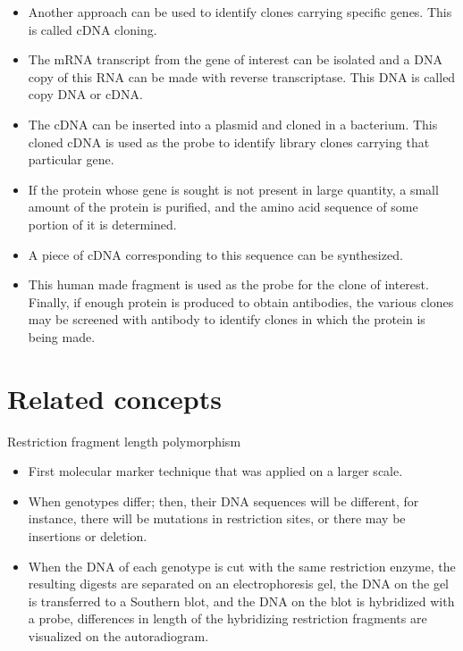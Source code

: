 \documentclass[11pt,dvipsnames,ignorenonframetext,aspectratio=169]{beamer}
\providecommand{\tightlist}{%
  \setlength{\itemsep}{0pt}\setlength{\parskip}{0pt}}
\begin{document}
\begin{frame}{}
\protect\hypertarget{section-21}{}
\begin{itemize}
\tightlist
\item
  Another approach can be used to identify clones carrying specific
  genes. This is called cDNA cloning.
\item
  The mRNA transcript from the gene of interest can be isolated and a
  DNA copy of this RNA can be made with reverse transcriptase. This DNA
  is called copy DNA or cDNA.
\item
  The cDNA can be inserted into a plasmid and cloned in a bacterium.
  This cloned cDNA is used as the probe to identify library clones
  carrying that particular gene.
\item
  If the protein whose gene is sought is not present in large quantity,
  a small amount of the protein is purified, and the amino acid sequence
  of some portion of it is determined.
\item
  A piece of cDNA corresponding to this sequence can be synthesized.
\item
  This human made fragment is used as the probe for the clone of
  interest. Finally, if enough protein is produced to obtain antibodies,
  the various clones may be screened with antibody to identify clones in
  which the protein is being made.
\end{itemize}
\end{frame}

\hypertarget{related-concepts}{%
\section{Related concepts}\label{related-concepts}}

\begin{frame}{Restriction fragment length polymorphism}
\protect\hypertarget{restriction-fragment-length-polymorphism}{}
\begin{itemize}
\tightlist
\item
  First molecular marker technique that was applied on a larger scale.
\item
  When genotypes differ; then, their DNA sequences will be different,
  for instance, there will be mutations in restriction sites, or there
  may be insertions or deletion.
\item
  When the DNA of each genotype is cut with the same restriction enzyme,
  the resulting digests are separated on an electrophoresis gel, the DNA
  on the gel is transferred to a Southern blot, and the DNA on the blot
  is hybridized with a probe, differences in length of the hybridizing
  restriction fragments are visualized on the autoradiogram.
\end{itemize}
\end{frame}
\end{document}
